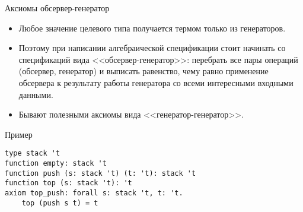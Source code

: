 \documentclass[hyperref={unicode=true}]{beamer}
\begin{document}
    \begin{frame}{Аксиомы обсервер-генератор}
    \begin{itemize}
    \item
    Любое значение целевого типа получается термом
    только из генераторов.
    \item
    Поэтому при написании алгебраической спецификации
    стоит начинать со спецификаций вида <<обсервер-генератор>>:
    перебрать все пары операций (обсервер, генератор)
    и выписать равенство, чему равно применение обсервера
    к результату работы генератора со всеми интересными
    входными данными.
    \item
    Бывают полезными аксиомы вида <<генератор-генератор>>.
    \end{itemize}
    \end{frame}

    \begin{frame}[fragile]{Пример}
    \begin{lstlisting}
type stack 't
function empty: stack 't
function push (s: stack 't) (t: 't): stack 't
function top (s: stack 't): 't
axiom top_push: forall s: stack 't, t: 't.
    top (push s t) = t
    \end{lstlisting}
    \end{frame}
\end{document}
